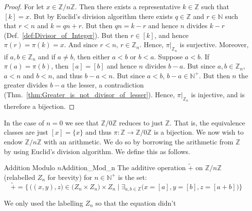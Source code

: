 \documentclass{article}                                                        %
\begin{document}
            \begin{proof}
                For let $x\in\mathbb{Z}/n\mathbb{Z}$. Then there exists a
                representative $k\in\mathbb{Z}$ such that $[k]=x$. But by
                Euclid's division algorithm there exists $q\in\mathbb{Z}$ and
                $r\in\mathbb{N}$ such that $r<n$ and $k=qn+r$. But then
                $qn=k-r$ and hence $n$ divides $k-r$
                (Def.~\ref{def:Divisor_of_Integer}). But then $r\in[k]$, and
                hence $\pi(r)=\pi(k)=x$. And since $r<n$, $r\in\mathbb{Z}_{n}$.
                Hence, $\pi|_{\mathbb{Z}_{n}}$ is surjective. Moreover, if
                $a,b\in\mathbb{Z}_{n}$ and if $a\ne{b}$, then either $a<b$ or
                $b<a$. Suppose $a<b$. If $\pi(a)=\pi(b)$, then $[a]=[b]$ and
                hence $n$ divides $b-a$. But since $a,b\in\mathbb{Z}_{n}$, $a<n$
                and $b<n$, and thus $b-a<n$. But since $a<b$,
                $b-a\in\mathbb{N}^{+}$. But then $n$ the greater divides $b-a$
                the lesser, a contradiction
                (Thm.~\ref{thm:Greater_is_not_divisor_of_lesser}). Hence,
                $\pi|_{\mathbb{Z}_{n}}$ is injective, and is therefore a
                bijection. 
            \end{proof}
            In the case of $n=0$ we see that $\mathbb{Z}/0\mathbb{Z}$ reduces to
            just $\mathbb{Z}$. That is, the equivalence classes are just
            $[x]=\{x\}$ and thus
            $\pi:\mathbb{Z}\rightarrow\mathbb{Z}/0\mathbb{Z}$ is a bijection. We
            now wish to endow $\mathbb{Z}/n\mathbb{Z}$ with an arithmetic. We do
            so by borrowing the arithmetic from $\mathbb{Z}$ by using Euclid's
            division algorithm. We define this as follows.
            \begin{fdefinition}{Addition Modulo $n$}{Addition_Mod_n}
                The additive operation $\tilde{+}$ on $\mathbb{Z}/n\mathbb{Z}$
                (relabelled $Z_{n}$ for brevity) for $n\in\mathbb{N}^{+}$ is the
                set:
                \begin{equation*}
                    \tilde{+}=\big\{\,\big((x,y),z\big)
                        \in\big(Z_{n}\times{Z}_{n}\big)\times{Z}_{n}\;\big|\;
                        \exists_{a,b\in\mathbb{Z}}
                        \big(x=[a],y=[b],z=[a+b]\big)\big\}
                \end{equation*}
            \end{fdefinition}
            We only used the labelling $Z_{n}$ so that the equation didn't
\end{document}

